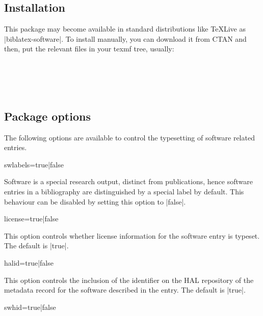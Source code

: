 \documentclass{ltxdockit}
\begin{document}
\subsection{Installation}\label{sec:install}

This package may become available in standard distributions like \TeX Live as
|biblatex-software|. To install manually, you can download it from CTAN and
then, put the relevant files in your texmf tree, usually:\\

\noindent{}\\
\\
\\
\\


\subsection{Package options}\label{sec:options}

The following options are available to control the typesetting of
software related entries.

\begin{ltxcode}
  swlabels=true|false
\end{ltxcode}

\noindent Software is a special research output, distinct from
publications, hence software entries in a bibliography are
distinguished by a special label by default.
This behaviour can be disabled by setting this option to |false|.

\begin{ltxcode}
  license=true|false
\end{ltxcode}

\noindent This option controls whether license information for
the software entry is typeset. The default is |true|.

\begin{ltxcode}
  halid=true|false
\end{ltxcode}

\noindent This option controls the inclusion of the identifier on the HAL repository of the
metadata record for the software described in the entry. The default is |true|.

\begin{ltxcode}
  swhid=true|false
\end{ltxcode}
\end{document}
